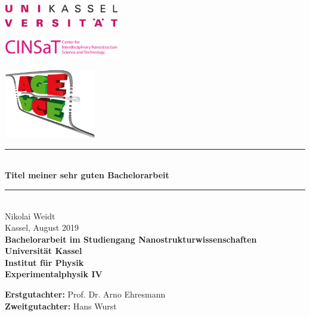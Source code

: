 \begin{titlepage}
  \begin{center}
    \begin{minipage}[T]{0.3\textwidth}
      \begin{flushleft}
        \includegraphics[width=5cm]{img/Uni}
      \end{flushleft}
    \end{minipage}
    \begin{minipage}[T]{0.3\textwidth}
      \centering
      \includegraphics[width=5cm]{img/CINSaT}
    \end{minipage}
    \begin{minipage}[T]{0.3\textwidth}
      \begin{flushright}
        \includegraphics[width=4cm]{img/AGE}
      \end{flushright}
    \end{minipage}
  \end{center}


  \begin{center}
    \rule{\columnwidth}{1 pt}\\
    \vspace{0.5cm}
    {\LARGE
      \textbf{Titel meiner sehr guten Bachelorarbeit} \\ 
    }
    \rule{\columnwidth}{1 pt}\\
    \vspace{2cm}
    {\Large
      Nikolai Weidt\\
      Kassel, August 2019\\
      \vspace{1.5cm}
    }
    {\bfseries
    Bachelorarbeit im Studiengang Nanostrukturwissenschaften\\ 
    Universität Kassel\\
    Institut für Physik\\
    Experimentalphysik IV\\
    }
    \end{center}
      \vfill
      {\begin{tabbing}
      \textbf{Erstgutachter:} Prof. Dr. Arno Ehresmann \\
      \textbf{Zweitgutachter:} Hans Wurst\\
      \end{tabbing}
      }

\end{titlepage}
\restoregeometry
